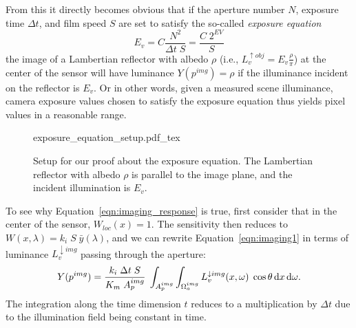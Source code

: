 From this it directly becomes obvious that if the aperture number $N$,
exposure time $\Delta t$, and film speed $S$ are set to satisfy the
so-called \emph{exposure equation}
\begin{equation}\label{eqn:imaging_Ev}
E_v = C \frac{N^2}{\Delta t\; S} = \frac{C\; 2^{EV}}S
\end{equation}
the image of a Lambertian reflector with albedo $\rho$ (i.e.,
$L_v^{\uparrow obj} = E_v \frac \rho \pi$) at the center of the sensor
will have luminance $Y(p^{img}) = \rho$ if the illuminance incident on
the reflector is $E_v$. Or in other words, given a measured scene
illuminance, camera exposure values chosen to satisfy the exposure
equation thus yields pixel values in a reasonable range.

\begin{figure}[t]
    \centering
    \def\svgwidth{0.9\linewidth}
    {exposure_equation_setup.pdf_tex}
    \caption{\label{fig:exposure_equation_setup}%
        Setup for our proof about the exposure equation. The Lambertian reflector with albedo $\rho$ is parallel to 
        the image plane, and the incident illumination is $E_v$. }
\end{figure}

To see why Equation~\eqref{eqn:imaging_response} is true, first consider that in the center of the sensor,
$W_{loc}(x) = 1$. The sensitivity then reduces to $W(x,\lambda) = k_i\;S\;\bar y(\lambda)$,
and we can rewrite Equation~\eqref{eqn:imaging1} in terms of luminance
$L_v^{\downarrow img}$ passing through the aperture:
\begin{equation}\label{eqn:imaging_y}
Y(p^{img}) 
           = \frac{k_i\; \Delta t \; S}{K_m\;A^{img}_p} \;
             \int_{A_p^{img}} 
             \int_{\Omega_a^{img}} 
                L^{\downarrow img}_{v}(x, \omega) \;
                \cos\theta \mathop{}\!\mathrm{d} x \mathop{}\!\mathrm{d}\omega.
\end{equation}
The integration along the time dimension $t$ reduces to a multiplication
by $\Delta t$ due to the illumination field being constant in time. 

%

